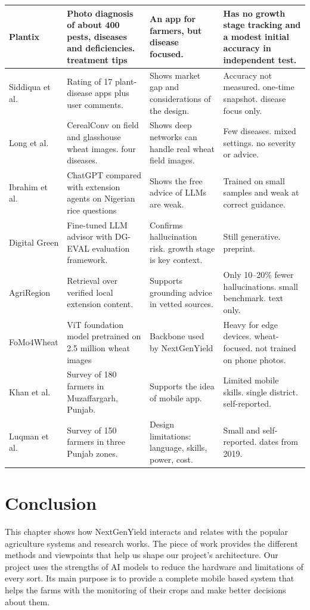 \documentclass{FastFyp}
\begin{document}
\begin{table}[!hbt]
\begin{tabular}{|p{2.4cm}|p{3.1cm}|p{3.8cm}|p{4.7cm}|}
Plantix \cite{ref:CABI:2020} & Photo diagnosis of about 400 pests, diseases and deficiencies. treatment tips& An app for farmers, but disease focused.& Has no growth stage tracking and a modest initial accuracy in independent test.\\ \hline
Siddiqua et al. \cite{ref:Siddiqua:2022} & Rating of 17 plant-disease apps plus user comments. & Shows market gap and considerations of the design. & Accuracy not measured. one-time snapshot. disease focus only. \\ \hline
Long et al. \cite{ref:Long:2023} & CerealConv on field and glasshouse wheat images. four diseases. & Shows deep networks can handle real wheat field images. & Few diseases. mixed settings. no severity or advice. \\ \hline
Ibrahim et al. \cite{ref:Ibrahim:2024} & ChatGPT compared with extension agents on Nigerian rice questions & Shows the free advice of LLMs are weak.& Trained on small samples and weak at correct guidance.\\ \hline
Digital Green \cite{ref:DigitalGreen:2026} & Fine-tuned LLM advisor with DG-EVAL evaluation framework. & Confirms hallucination risk. growth stage is key context. & Still generative. preprint. \\ \hline
AgriRegion \cite{ref:Fanuel:2025} & Retrieval over verified local extension content. & Supports grounding advice in vetted sources. & Only 10--20\% fewer hallucinations. small benchmark. text only. \\ \hline
FoMo4Wheat \cite{ref:Han:2025} & ViT foundation model pretrained on 2.5 million wheat images & Backbone used by NextGenYield & Heavy for edge devices. wheat-focused. not trained on phone photos.\\ \hline
Khan et al. \cite{ref:Khan:2019} & Survey of 180 farmers in Muzaffargarh, Punjab. & Supports the idea of mobile app. & Limited mobile skills. single district. self-reported. \\ \hline
Luqman et al. \cite{ref:Luqman:2019} & Survey of 150 farmers in three Punjab zones. & Design limitations: language, skills, power, cost. & Small and self-reported. dates from 2019. \\ \hline
\end{tabular}
\end{table}


\section{Conclusion}
This chapter shows how NextGenYield interacts and relates with the popular agriculture systems and research works. The piece of work provides the different methods and viewpoints that help us shape our project’s architecture. Our project uses the strengths of AI models to reduce the hardware and limitations of every sort. Its main purpose is to provide a complete mobile based system that helps the farms with the monitoring of their crops and make better decisions about them. 
 
\end{document}
